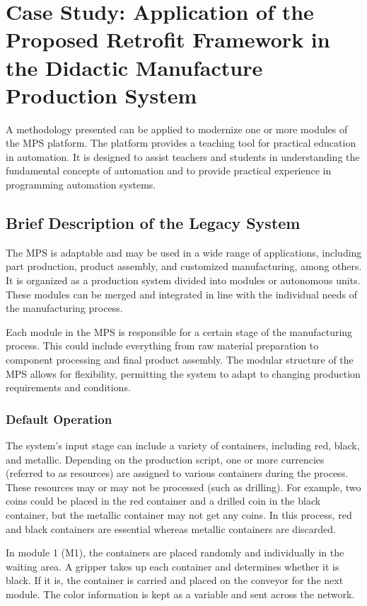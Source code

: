 \documentclass[journal]{IEEEtran}
\begin{document}
\section{Case Study: Application of the Proposed Retrofit Framework in the Didactic Manufacture Production System}

A methodology presented can be applied to modernize one or more modules of the MPS platform. The platform provides a teaching tool for practical education in automation. It is designed to assist teachers and students in understanding the fundamental concepts of automation and to provide practical experience in programming automation systems.

\subsection{Brief Description of the Legacy System}

The MPS is adaptable and may be used in a wide range of applications, including part production, product assembly, and customized manufacturing, among others. It is organized as a production system divided into modules or autonomous units. These modules can be merged and integrated in line with the individual needs of the manufacturing process.

Each module in the MPS is responsible for a certain stage of the manufacturing process. This could include everything from raw material preparation to component processing and final product assembly. The modular structure of the MPS allows for flexibility, permitting the system to adapt to changing production requirements and conditions.

\subsubsection{Default Operation}

The system's input stage can include a variety of containers, including red, black, and metallic. Depending on the production script, one or more currencies (referred to as resources) are assigned to various containers during the process. These resources may or may not be processed (such as drilling). For example, two coins could be placed in the red container and a drilled coin in the black container, but the metallic container may not get any coins. In this process, red and black containers are essential whereas metallic containers are discarded.

In module 1 (M1), the containers are placed randomly and individually in the waiting area. A gripper takes up each container and determines whether it is black. If it is, the container is carried and placed on the conveyor for the next module. The color information is kept as a variable and sent across the network.
\end{document}
